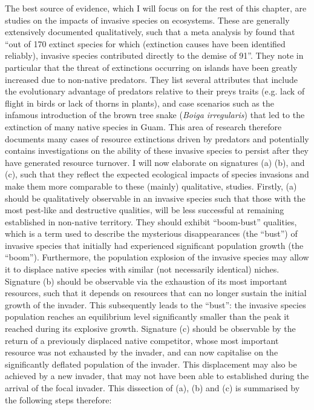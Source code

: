 \documentclass[a4paper]{report}
\begin{document}
The best source of evidence, which I will focus on for the rest of this chapter, are studies on the impacts of invasive species on ecosystems. These are generally extensively documented qualitatively, such that a meta analysis by \citep{Sodhi2014} found that “out of 170 extinct species for which (extinction causes have been identified reliably), invasive species contributed directly to the demise of 91”. They note in particular that the threat of extinctions occurring on islands have been greatly increased due to non-native predators. They list several attributes that include the evolutionary advantage of predators relative to their preys traits (e.g. lack of flight in birds or lack of thorns in plants), and case scenarios such as the infamous introduction of the brown tree snake (\textit{Boiga irregularis}) that led to the extinction of many native species in Guam. This area of research therefore documents many cases of resource extinctions driven by predators and potentially contains investigations on the ability of these invasive species to persist after they have generated resource turnover. I will now elaborate on signatures (a) (b), and (c), such that they reflect the expected ecological impacts of species invasions and make them more comparable to these (mainly) qualitative, studies. Firstly, (a) should be qualitatively observable in an invasive species such that those with the most pest-like and destructive qualities, will be less successful at remaining established in non-native territory. They should exhibit “boom-bust” qualities, which is a term used to describe the mysterious disappearances (the “bust”) of invasive species that initially had experienced significant population growth (the “boom”). Furthermore, the population explosion of the invasive species may allow it to displace native species with similar (not necessarily identical) niches. Signature (b) should be observable via the exhaustion of its most important resources, such that it depends on resources that can no longer sustain the initial growth of the invader. This subsequently leads to the “bust”: the invasive species population reaches an equilibrium level significantly smaller than the peak it reached during its explosive growth. Signature (c) should be observable by the return of a previously displaced native competitor, whose most important resource was not exhausted by the invader, and can now capitalise on the significantly deflated population of the invader. This displacement may also be achieved by a new invader, that may not have been able to established during the arrival of the focal invader. This dissection of (a), (b) and (c) is summarised by the following steps therefore:
\end{document}
